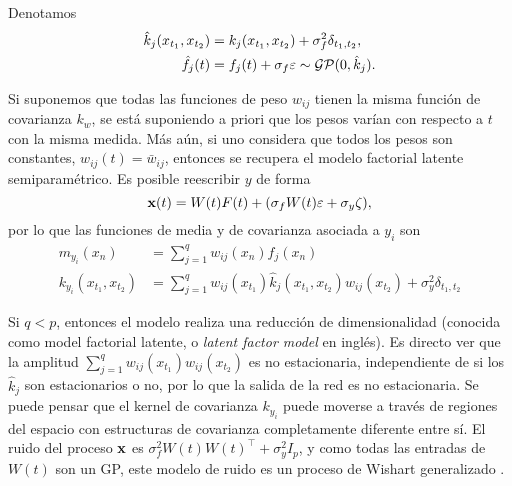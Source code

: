 Denotamos
\begin{align*}
\hat{k}_{j}(x_{t_{1}}, x_{t_{2}})	&= k_{j}(x_{t_{1}}, x_{t_{2}}) + \sigma_{f}^{2} \delta_{t_{1}, t_{2}}, \\
\hat{f}_{j}(t)						&= f_{j}(t) + \sigma_{f} \varepsilon \sim \operatorname{\mathcal{GP}}(0, \hat{k}_{j}).
\end{align*}

Si suponemos que todas las funciones de peso \(w_{ij}\) tienen la misma función de covarianza \(k_{w}\), se está suponiendo a priori que los pesos varían con respecto a \(t\) con la misma medida. Más aún, si uno considera que todos los pesos son constantes, \(w_{ij}(t) = \bar{w}_{ij}\), entonces se recupera el modelo factorial latente semiparamétrico. Es posible reescribir \(y\) de forma
\begin{equation*}
\mathbf{x}(t) = W(t) F(t) + (\sigma_{f} W(t) \varepsilon + \sigma_{y}\zeta),
\end{equation*}
por lo que las funciones de media y de covarianza asociada a \(y_{i}\) son
\begin{align*}
m_{y_{i}}(x_{n})				&= \sum_{j=1}^{q} w_{ij}(x_{n}) f_{j}(x_{n}) \\
k_{y_{i}}(x_{t_{1}}, x_{t_{2}})	&= \sum_{j=1}^{q} w_{ij}(x_{t_{1}}) \hat{k}_{j}(x_{t_{1}}, x_{t_{2}}) w_{ij}(x_{t_{2}}) + \sigma_{y}^{2} \delta_{t_{1}, t_{2}}
\end{align*}

Si \(q < p\), entonces el modelo realiza una reducción de dimensionalidad (conocida como model factorial latente, o \emph{latent factor model} en inglés). Es directo ver que la amplitud \(\sum_{j=1}^{q}w_{ij}(x_{t_{1}}) w_{ij}(x_{t_{2}})\) es no estacionaria, independiente de si los \(\hat{k}_{j}\) son estacionarios o no, por lo que la salida de la red es no estacionaria. Se puede pensar que el kernel de covarianza \(k_{y_{i}}\) puede moverse a través de regiones del espacio con estructuras de covarianza completamente diferente entre sí. El ruido del proceso \(\mathbf{x}\) es \(\sigma_{f}^{2} W(t) W(t)^{\top} + \sigma_{y}^{2} I_{p}\), y como todas las entradas de \(W(t)\) son un GP, este modelo de ruido es un proceso de Wishart generalizado \cite{wilson2010generalised}.

